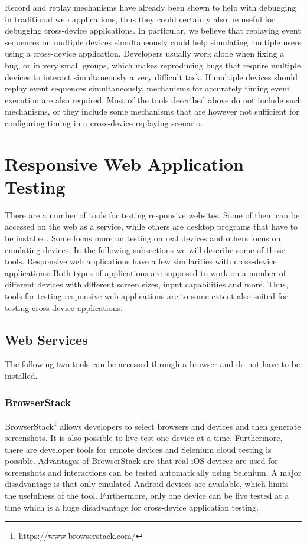 Record and replay mechanisms have already been shown to help with debugging in traditional web applications, thus they could certainly also be useful for debugging cross-device applications. In particular, we believe that replaying event sequences on multiple devices simultaneously could help simulating multiple users using a cross-device application. Developers usually work alone when fixing a bug, or in very small groups, which makes reproducing bugs that require multiple devices to interact simultaneously a very difficult task. If multiple devices should replay event sequences simultaneously, mechanisms for accurately timing event execution are also required. Most of the tools described above do not include such mechanisms, or they include some mechanisms that are however not sufficient for configuring timing in a cross-device replaying scenario.

\section{Responsive Web Application Testing}

There are a number of tools for testing responsive websites. Some of them can be accessed on the web as a service, while others are desktop programs that have to be installed. Some focus more on testing on real devices and others focus on emulating devices. In the following subsections we will describe some of those tools. Responsive web applications have a few similarities with cross-device applications: Both types of applications are supposed to work on a number of different devices with different screen sizes, input capabilities and more. Thus, tools for testing responsive web applications are to some extent also suited for testing cross-device applications.

\subsection{Web Services}

The following two tools can be accessed through a browser and do not have to be installed.

\subsubsection{BrowserStack}

BrowserStack\footnote{\url{https://www.browserstack.com/}} allows developers to select browsers and devices and then generate screenshots. It is also possible to live test one device at a time. Furthermore, there are developer tools for remote devices and Selenium cloud testing is possible. Advantages of BrowserStack are that real iOS devices are used for screenshots and interactions can be tested automatically using Selenium. A major disadvantage is that only emulated Android devices are available, which limits the usefulness of the tool. Furthermore, only one device can be live tested at a time which is a huge disadvantage for cross-device application testing. 

